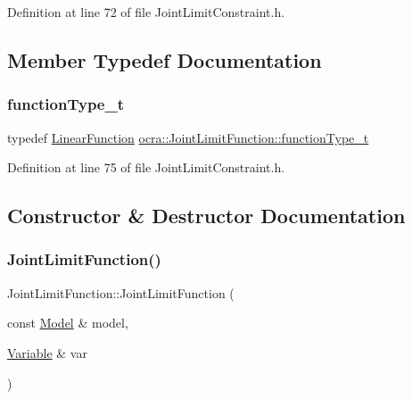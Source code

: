 Definition at line 72 of file Joint\+Limit\+Constraint.\+h.



\subsection{Member Typedef Documentation}
\hypertarget{classocra_1_1JointLimitFunction_af300f2c709840b94759c445130ec9a18}{}\label{classocra_1_1JointLimitFunction_af300f2c709840b94759c445130ec9a18} 
\subsubsection{\texorpdfstring{function\+Type\+\_\+t}{functionType\_t}}
{\footnotesize\ttfamily typedef \hyperlink{classocra_1_1LinearFunction}{Linear\+Function} \hyperlink{classocra_1_1JointLimitFunction_af300f2c709840b94759c445130ec9a18}{ocra\+::\+Joint\+Limit\+Function\+::function\+Type\+\_\+t}}



Definition at line 75 of file Joint\+Limit\+Constraint.\+h.



\subsection{Constructor \& Destructor Documentation}
\hypertarget{classocra_1_1JointLimitFunction_a00952411e7a7906fc6e5aedcfcfc6bc3}{}\label{classocra_1_1JointLimitFunction_a00952411e7a7906fc6e5aedcfcfc6bc3} 
\subsubsection{\texorpdfstring{Joint\+Limit\+Function()}{JointLimitFunction()}}
{\footnotesize\ttfamily Joint\+Limit\+Function\+::\+Joint\+Limit\+Function (\begin{DoxyParamCaption}\item[{const \hyperlink{classocra_1_1Model}{Model} \&}]{model,  }\item[{\hyperlink{classocra_1_1Variable}{Variable} \&}]{var }\end{DoxyParamCaption})}

